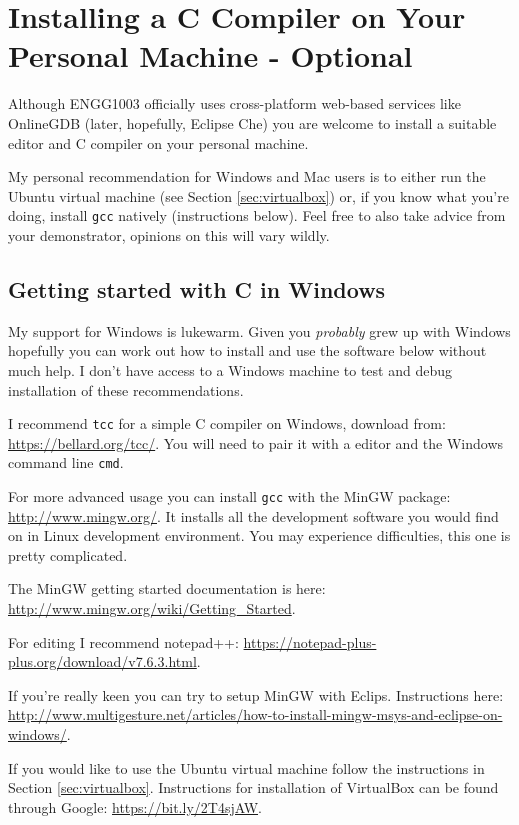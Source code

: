 \documentclass{lab}
\begin{document}
\pagebreak
\section{Installing a C Compiler on Your Personal Machine - Optional}

Although ENGG1003 officially uses cross-platform web-based services like OnlineGDB (later, hopefully, Eclipse Che) you are welcome to install a suitable editor and C compiler on your personal machine.

My personal recommendation for Windows and Mac users is to either run the Ubuntu virtual machine (see Section \ref{sec:virtualbox}) or, if you know what you're doing, install \texttt{gcc} natively (instructions below). Feel free to also take advice from your demonstrator, opinions on this will vary wildly.

\subsection{Getting started with C in Windows}

My support for Windows is lukewarm. Given you \textit{probably} grew up with Windows hopefully you can work out how to install and use the software below without much help. I don't have access to a Windows machine to test and debug installation of these recommendations.

I recommend \texttt{tcc} for a simple C compiler on Windows, download from: \url{https://bellard.org/tcc/}. You will need to pair it with a editor and the Windows command line \texttt{cmd}.

For more advanced usage you can install \texttt{gcc} with the MinGW package: \url{http://www.mingw.org/}. It installs all the development software you would find on in Linux development environment. You may experience difficulties, this one is pretty complicated.

The MinGW getting started documentation is here: \url{http://www.mingw.org/wiki/Getting_Started}.

For editing I recommend notepad++: \url{https://notepad-plus-plus.org/download/v7.6.3.html}.

If you're really keen you can try to setup MinGW with Eclips. Instructions here: \url{http://www.multigesture.net/articles/how-to-install-mingw-msys-and-eclipse-on-windows/}.

If you would like to use the Ubuntu virtual machine follow the instructions in Section \ref{sec:virtualbox}. Instructions for installation of VirtualBox can be found through Google: \url{https://bit.ly/2T4sjAW}.
\end{document}
